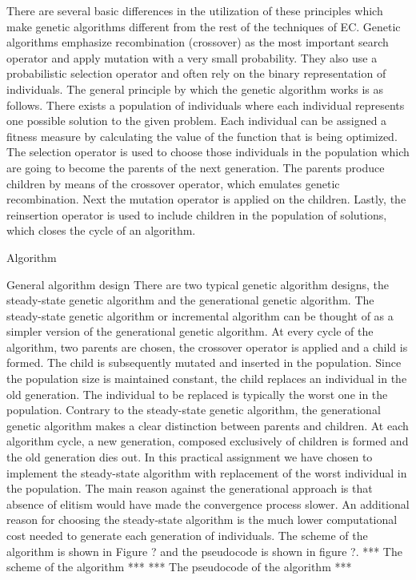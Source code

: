 There are several basic differences in the utilization of these principles which make genetic algorithms different from the rest of the techniques of EC. Genetic algorithms emphasize recombination (crossover) as the most important search operator and apply mutation with a very small probability. They also use a probabilistic selection operator and often rely on the binary representation of individuals.
The general principle by which the genetic algorithm works is as follows. There exists a population of individuals where each individual represents one possible solution to the given problem. Each individual can be assigned a fitness measure by calculating the value of the function that is being optimized. The selection operator is used to choose those individuals in the population which are going to become the parents of the next generation. The parents produce children by means of the crossover operator, which emulates genetic recombination. Next the mutation operator is applied on the children. Lastly, the reinsertion operator is used to include children in the population of solutions, which closes the cycle of an algorithm.

Algorithm

General algorithm design
There are two typical genetic algorithm designs, the steady-state genetic algorithm and the generational genetic algorithm.
The steady-state genetic algorithm or incremental algorithm can be thought of as a simpler version of the generational genetic algorithm. At every cycle of the algorithm, two parents are chosen, the crossover operator is applied and a child is formed. The child is subsequently mutated and inserted in the population. Since the population size is maintained constant, the child replaces an individual in the old generation. The individual to be replaced is typically the worst one in the population.
Contrary to the steady-state genetic algorithm, the generational genetic algorithm makes a clear distinction between parents and children. At each algorithm cycle, a new generation, composed exclusively of children is formed and the old generation dies out.
In this practical assignment we have chosen to implement the steady-state algorithm with replacement of the worst individual in the population. The main reason against the generational approach is that absence of elitism would have made the convergence process slower. An additional reason for choosing the steady-state algorithm is the much lower computational cost needed to generate each generation of individuals. The scheme of the algorithm is shown in Figure ? and the pseudocode is shown in figure ?.
*** The scheme of the algorithm ***
*** The pseudocode of the algorithm ***


